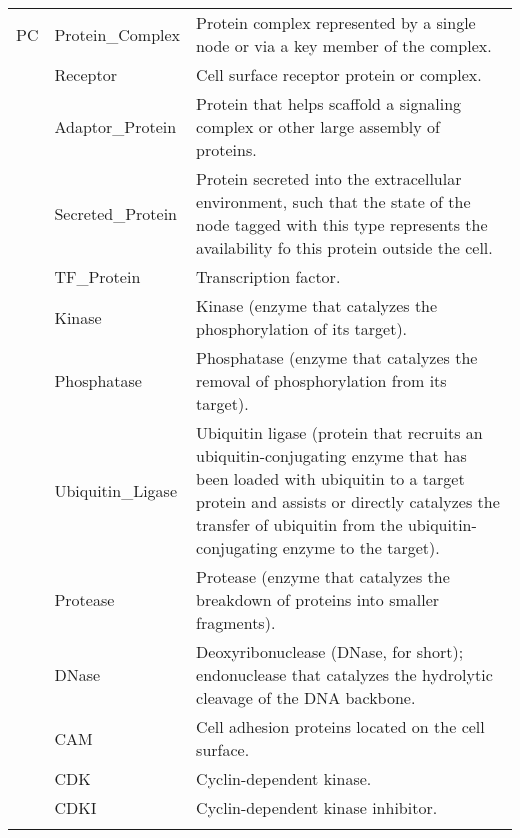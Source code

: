 \documentclass{article}
\begin{document}
\begin{subtables}
\begin{longtable}[c]{@{}llp{}@{}}
{\footnotesize{}PC}&Protein\_{}Complex&Protein complex represented by a single node or via a key member of the complex.\\\addlinespace[\dimexpr0.75\defaultaddspace]
{\footnotesize{}Rec}&Receptor&Cell surface receptor protein or complex.\\\addlinespace[\dimexpr0.75\defaultaddspace]
{\footnotesize{}Adap}&Adaptor\_{}Protein&Protein that helps scaffold a signaling complex or other large assembly of proteins.\\\addlinespace[\dimexpr0.75\defaultaddspace]
{\footnotesize{}Secr}&Secreted\_{}Protein&Protein secreted into the extracellular environment, such that the state of the node tagged with this type represents the availability fo this protein outside the cell.\\\addlinespace[\dimexpr0.75\defaultaddspace]
{\footnotesize{}TF}&TF\_{}Protein&Transcription factor.\\\addlinespace[\dimexpr0.75\defaultaddspace]
{\footnotesize{}K}&Kinase&Kinase (enzyme that catalyzes the phosphorylation of its target).\\\addlinespace[\dimexpr0.75\defaultaddspace]
{\footnotesize{}Ph}&Phosphatase&Phosphatase (enzyme that catalyzes the removal of phosphorylation from its target).\\\addlinespace[\dimexpr0.75\defaultaddspace]
{\footnotesize{}UbL}&Ubiquitin\_{}Ligase&Ubiquitin ligase (protein that recruits an ubiquitin-conjugating enzyme that has been loaded with ubiquitin to a target protein and assists or directly catalyzes the transfer of ubiquitin from the ubiquitin-conjugating enzyme to the target).\\\addlinespace[\dimexpr0.75\defaultaddspace]
{\footnotesize{}PTase}&Protease&Protease (enzyme that catalyzes the breakdown of proteins into smaller fragments).\\\addlinespace[\dimexpr0.75\defaultaddspace]
{\footnotesize{}DNase}&DNase&Deoxyribonuclease (DNase, for short); endonuclease that catalyzes the hydrolytic cleavage of the DNA backbone.\\\addlinespace[\dimexpr0.75\defaultaddspace]
{\footnotesize{}CAM}&CAM&Cell adhesion proteins located on the cell surface.\\\addlinespace[\dimexpr0.75\defaultaddspace]
{\footnotesize{}CDK}&CDK&Cyclin-dependent kinase.\\\addlinespace[\dimexpr0.75\defaultaddspace]
{\footnotesize{}CDKI}&CDKI&Cyclin-dependent kinase inhibitor.\\

\end{longtable}
\end{subtables}
\end{document}
